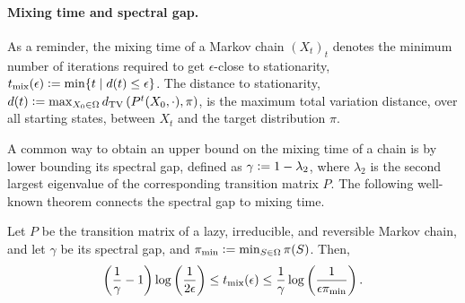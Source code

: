 %
%

\paragraph{Mixing time and spectral gap.}
As a reminder, the mixing time of a Markov chain $(X_t)_t$ denotes the minimum number of iterations required to get $\epsilon$-close to stationarity, $t_{\mathrm{mix}}(\epsilon) \vcentcolon= \min \{ t \mid d(t) \leq \epsilon \}$.
The distance to stationarity, $d(t) \vcentcolon= \max_{X_0 \in \Omega} d_{\textrm{TV}}\left( P^t(X_0, \cdot), \pi \right)$, is the maximum total variation distance, over all starting states, between $X_t$ and the target distribution $\pi$.

A common way to obtain an upper bound on the mixing time of a chain is by lower bounding its spectral gap, defined as $\gamma \vcentcolon= 1 - \lambda_2$, where $\lambda_2$ is the second largest eigenvalue of the corresponding transition matrix $P$.
The following well-known theorem connects the spectral gap to mixing time.
\begin{theorem} \label{thm:spectral}
  Let $P$ be the transition matrix of a lazy, irreducible, and reversible Markov chain, and let $\gamma$ be its spectral gap, and $\pi_{\textrm{min}} \vcentcolon= \min_{S \in \Omega} \pi(S)$. Then,
  \begin{align*}
    \left( \frac{1}{\gamma} - 1 \right)\log\left( \frac{1}{2\epsilon} \right) \leq t_{\mathrm{mix}}(\epsilon) \leq \frac{1}{\gamma} \log\left( \frac{1}{\epsilon\pi_{\textrm{min}}} \right).
  \end{align*}
\end{theorem}

